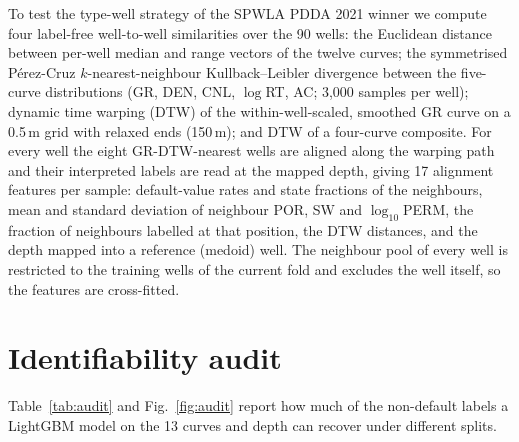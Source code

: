 \documentclass[preprint,12pt]{elsarticle}
\begin{document}
To test the type-well strategy of the SPWLA PDDA 2021 winner \cite{fu2024contest} we compute four label-free well-to-well similarities over the 90 wells: the Euclidean distance between per-well median and range vectors of the twelve curves; the symmetrised P\'erez-Cruz $k$-nearest-neighbour Kullback--Leibler divergence between the five-curve distributions (GR, DEN, CNL, $\log$RT, AC; 3,000 samples per well); dynamic time warping (DTW) of the within-well-scaled, smoothed GR curve on a 0.5\,m grid with relaxed ends (150\,m); and DTW of a four-curve composite. For every well the eight GR-DTW-nearest wells are aligned along the warping path and their interpreted labels are read at the mapped depth, giving 17 alignment features per sample: default-value rates and state fractions of the neighbours, mean and standard deviation of neighbour POR, SW and $\log_{10}$PERM, the fraction of neighbours labelled at that position, the DTW distances, and the depth mapped into a reference (medoid) well. The neighbour pool of every well is restricted to the training wells of the current fold and excludes the well itself, so the features are cross-fitted.

\section{Identifiability audit}
\label{sec:audit}

Table~\ref{tab:audit} and Fig.~\ref{fig:audit} report how much of the non-default labels a LightGBM \cite{ke2017lightgbm} model on the 13 curves and depth can recover under different splits.

\begin{table}[t]
\centering
\caption{Identifiability audit: official accuracy on non-default samples (LightGBM on 13 curves + depth) under different splits, and label-structure statistics.}
\label{tab:audit}
\small
{}
\end{table}
\end{document}
